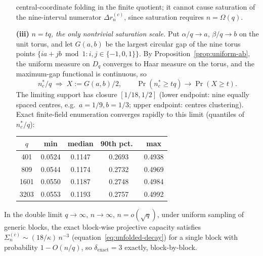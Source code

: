 \begin{enumerate}
        central-coordinate folding in the finite quotient; it cannot cause saturation of
        the nine-interval numerator $\Delta r_n^{(c)}$, since saturation requires $n=\Omega(q)$.
      \item[\textbf{(iii)}] \emph{$n=tq$, the only nontrivial saturation scale.}
        Put $\alpha/q\to a$, $\beta/q\to b$ on the unit torus, and let $G(a,b)$ be the largest
        circular gap of the nine torus points $\{ia+jb \bmod 1 : i,j\in\{-1,0,1\}\}$.
        By Proposition~\ref{prop:uniform-ab}, the uniform measure on $D_q$ converges to Haar
        measure on the torus, and the maximum-gap functional is continuous, so
        \begin{equation}
          n_c^*/q \;\Longrightarrow\; X := G(a,b)/2, \qquad \Pr(n_c^*\geq tq)\to\Pr(X\geq t).
          \label{eq:scaling-limit}
        \end{equation}
        The limiting support has closure $[1/18,1/2]$ (lower endpoint: nine equally spaced
        centres, e.g.\ $a=1/9,b=1/3$; upper endpoint: centres clustering).
        Exact finite-field enumeration converges rapidly to this limit
        (quantiles of $n_c^*/q$):
        \begin{center}
          \begin{tabular}{ccccc}
            \hline
            $q$    & min    & median & 90th pct.\ & max    \\
            \hline
            401    & 0.0524 & 0.1147 & 0.2693     & 0.4938 \\
            809    & 0.0544 & 0.1174 & 0.2732     & 0.4969 \\
            1601   & 0.0550 & 0.1187 & 0.2748     & 0.4984 \\
            3203   & 0.0553 & 0.1193 & 0.2757     & 0.4992 \\
            \hline
          \end{tabular}
        \end{center}
    \end{enumerate}

    \begin{proposition}
      \label{prop:delta-3}
      In the double limit $q\to\infty$, $n\to\infty$, $n=o(\sqrt{q})$, under uniform sampling
      of generic blocks, the exact block-wise projective capacity satisfies
      $\Sigma_n^{(c)}\sim(18/\kappa)\,n^{-3}$ (equation~\eqref{eq:unfolded-decay}) for a
      single block with probability $1-O(n/q)$, so $\delta_{\mathrm{exact}}=3$
      exactly, block-by-block.
    \end{proposition}

